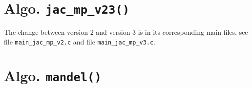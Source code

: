 \section*{Algo. \texttt{jac\_mp\_v23()}}
The change between version 2 and version 3 is in its corresponding main files, see file \texttt{main\_jac\_mp\_v2.c} and file \texttt{main\_jac\_mp\_v3.c}.



\newpage
\section*{Algo. \texttt{mandel()}}
